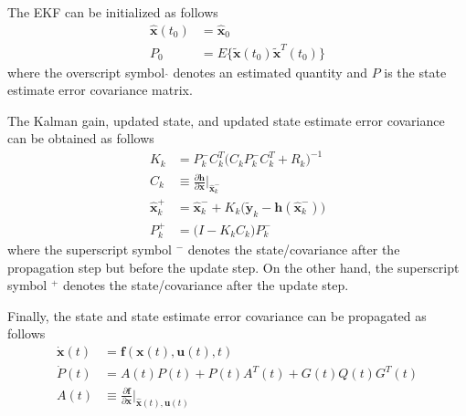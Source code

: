\documentclass{article}
\begin{document}
The EKF can be initialized as follows
\begin{equation}
    \begin{split}
        \hat{\bm{x}}(t_0) &= \hat{\bm{x}}_0\\
        P_0 &= E\{\widetilde{\bm{x}}(t_0) \widetilde{\bm{x}}^T(t_0)\}
    \end{split}
\end{equation}
where the overscript symbol $\hat{}$ denotes an estimated quantity and $P$ is the state estimate error covariance matrix.

The Kalman gain, updated state, and updated state estimate error covariance can be obtained as follows
\begin{equation}
    \begin{split}
        K_k &= P_k^- C_k^T \biggl(C_k P_k^- C_k^T + R_k\biggr)^{-1}\\
        C_k &\equiv \frac{\partial \bm{h}}{\partial \bm{x}}\bigg|_{{\hat{\bm{x}}}_k^-}\\
        \hat{\bm{x}}_k^+ &= \hat{\bm{x}}_k^- + K_k \biggl(\widetilde{\bm{y}}_k - \bm{h}(\hat{\bm{x}}_k^-)\biggr)\\
        P_k^+ &= \biggl(I - K_k C_k\biggr) P_k^-
    \end{split}
\end{equation}
where the superscript symbol $^-$ denotes the state/covariance after the propagation step but before the update step. 
On the other hand, the superscript symbol $^+$ denotes the state/covariance after the update step.

Finally, the state and state estimate error covariance can be propagated as follows
\begin{equation}
    \begin{split}
        \dot{\bm{x}}(t) &= \bm{f}(\bm{x}(t), \bm{u}(t), t)\\
        \dot{P}(t) &= A(t) P(t) + P(t) A^T(t) + G(t) Q(t) G^T(t)\\
        A(t) &\equiv \frac{\partial \bm{f}}{\partial \bm{x}}\bigg|_{\hat{\bm{x}}(t), \bm{u}(t)}
    \end{split}
\end{equation}
\end{document}

